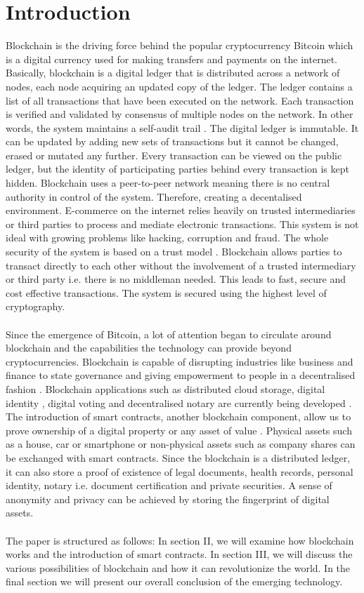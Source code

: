 \documentclass[report]{IEEEtran}
\begin{document}
\section{Introduction}
Blockchain is the driving force behind the popular cryptocurrency Bitcoin which is a digital currency used for making transfers and payments on the internet. Basically, blockchain is a digital ledger that is distributed across a network of nodes, each node acquiring an updated copy of the ledger. The ledger contains a list of all transactions that have been executed on the network. Each transaction is verified and validated by consensus of multiple nodes on the network. In other words, the system maintains a self-audit trail \cite{finance}. The digital ledger is immutable. It can be updated by adding new sets of transactions but it cannot be changed, erased or mutated any further. Every transaction can be viewed on the public ledger, but the identity of participating parties behind every transaction is kept hidden. Blockchain uses a peer-to-peer network \cite{bitcoin} meaning there is no central authority in control of the system. Therefore, creating a decentalised environment. E-commerce on the internet relies heavily on trusted intermediaries or third parties to process and mediate electronic transactions. This system is not ideal with growing problems like hacking, corruption and fraud. The whole security of the system is based on a trust model \cite{bitcoin}. Blockchain allows parties to transact directly to each other without the involvement of a trusted intermediary or third party i.e. there is no middleman needed. This leads to fast, secure and cost effective transactions. The system is secured using the highest level of cryptography.
\\\\ Since the emergence of Bitcoin, a lot of attention began to circulate around blockchain and the capabilities the technology can provide beyond cryptocurrencies. Blockchain is capable of disrupting industries like business and finance to state governance and giving empowerment to people in a decentralised fashion \cite{survey}. Blockchain applications such as distributed cloud storage, digital identity \cite{beyond}, digital voting and decentralised notary are currently being developed \cite{air}. The introduction of smart contracts, another blockchain component, allow us to prove ownership of a digital property or any asset of value \cite{smartcon}. Physical assets such as a house, car or smartphone or non-physical assets such as company shares can be exchanged with smart contracts. Since the blockchain is a distributed ledger, it can also store a proof of existence of legal documents, health records, personal identity, notary i.e. document certification and private securities. A sense of anonymity and privacy can be achieved by storing the fingerprint of digital assets. 
\\\\ The paper is structured as follows: In section II, we will examine how blockchain works and the introduction of smart contracts. In section III, we will discuss the various possibilities of blockchain and how it can revolutionize the world. In the final section we will present our overall conclusion of the emerging technology.
\end{document}
